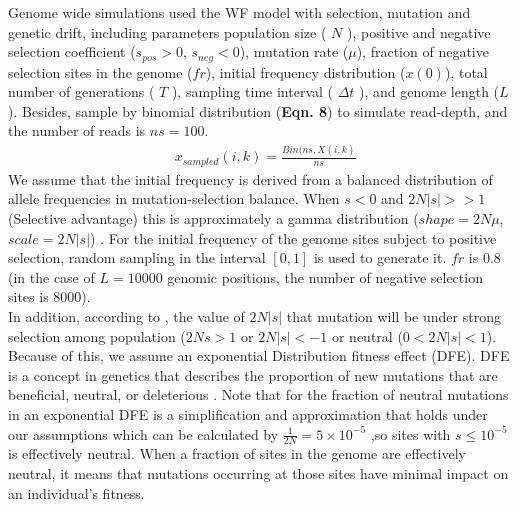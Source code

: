 \documentclass[12pt]{article}
\begin{document}
Genome wide simulations used the WF model with selection, mutation and genetic drift, including parameters population size ( $N$ ), positive and negative selection coefficient ($s_{pos} > 0$, $s_{neg} < 0$), mutation rate ($\mu$), fraction of negative selection sites in the genome ($fr$), initial frequency distribution ($x(0)$), total number of generations ( $T$ ), sampling time interval ( $\Delta t$ ), and genome length ($L$). Besides, sample by binomial distribution (\textbf{Eqn. 8}) to simulate read-depth, and the number of reads is $ns=100$.
\begin{align}
  & x_{sampled}(i,k) = \frac{Bin(ns,X(i,k)}{ns}
\end{align}
We assume that the initial frequency is derived from a balanced distribution of allele frequencies in mutation-selection balance. When $s<0$ and $2N|s|>>1$ (Selective advantage) \citep{desai2007beneficial} this is approximately a gamma distribution ($shape=2N\mu$, $scale=2N|s|$) \citep{kim2017inference}. For the initial frequency of the genome sites subject to positive selection, random sampling in the interval $[0, 1]$ is used to generate it. $fr$ is 0.8 (in the case of $L=10000$ genomic positions, the number of negative selection sites is 8000). \\

In addition, according to \cite{10.1093/genetics/47.6.713}, the value of $2N|s|$ that mutation will be under strong selection among population ($2Ns >1$ or $2N|s| <-1$ or neutral ($0<2N|s|<1$). Because of this, we assume an exponential Distribution fitness effect (DFE). DFE is a concept in genetics that describes the proportion of new mutations that are beneficial, neutral, or deleterious \citep{eyre2007distribution}. Note that for the fraction of neutral mutations in an exponential DFE is a simplification and approximation that holds under our assumptions which can be calculated by $\frac{1}{2N}=5\times 10^{-5}$ \citep{kimura1979model},so sites with $s\leq 10^{-5}$ is effectively neutral.  When a fraction of sites in the genome are effectively neutral, it means that mutations occurring at those sites have minimal impact on an individual's fitness.\\
\end{document}
